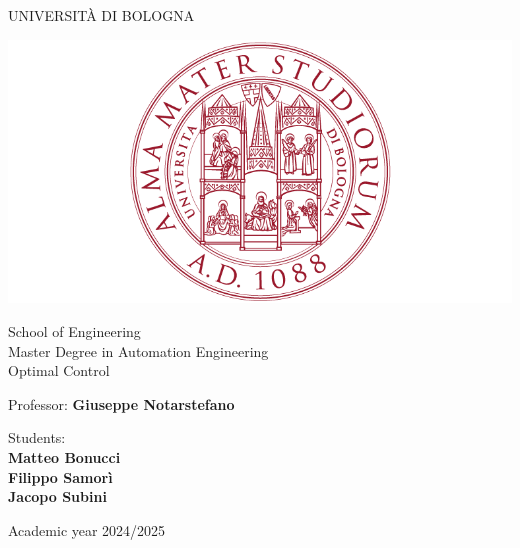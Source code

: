 \documentclass[a4paper,11pt,oneside]{book}
\begin{document}
\pagestyle{myheadings}

\thispagestyle{empty}                                                 
\begin{center}                                                            
    \vspace{5mm}
    {\LARGE UNIVERSIT\`A DI BOLOGNA} \\                       
      \vspace{5mm}
\end{center}
\begin{center}
  \includegraphics[scale=.27]{figs/logo_unibo}
\end{center}
\begin{center}
      \vspace{5mm}
      {\LARGE School of Engineering} \\
        \vspace{3mm}
      {\Large Master Degree in Automation Engineering} \\
      \vspace{20mm}
      {\LARGE Optimal Control} \\
      \vspace{15mm}
\end{center}
\begin{flushleft}                                                                              
     {\large Professor: \textbf{\@ Giuseppe Notarstefano}} \\        
      \vspace{13mm}
\end{flushleft}
\begin{flushright}
      {\large Students:\\
      \textbf{Matteo Bonucci\\
      Filippo Samor\`{i}\\
      Jacopo Subini}
      }\\
\end{flushright}        %
\begin{center}
\vfill
      {\large Academic year \@2024/2025} \\
\end{center}
\end{document}
